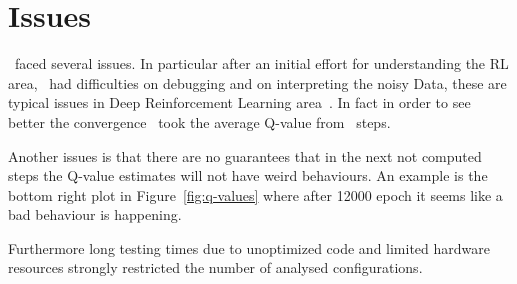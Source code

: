 
\section{Issues}

\Auth~faced several issues. In particular after an initial effort for understanding the RL area, \auth~had difficulties on debugging and on interpreting the noisy Data, these are typical issues in Deep Reinforcement Learning area~\cite{rlblogpost}. In fact in order to see better the convergence \auth~took the average Q-value from \numepoch~steps.

Another issues is that there are no guarantees that in the next not computed steps the Q-value estimates will not have weird behaviours. An example is the bottom right plot in Figure~\ref{fig:q-values} where after 12000 epoch it seems like a bad behaviour is happening.

Furthermore long testing times due to unoptimized code and limited hardware resources strongly restricted the number of analysed configurations.

